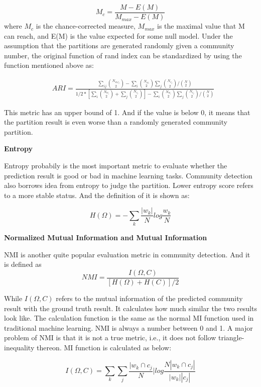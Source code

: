 $$
M_{c} = \frac{M-E(M)}{M_{max}-E(M)}
$$
where $M_{c}$ is the chance-corrected measure, $M_{max}$ is the maximal value that M can
reach, and E(M) is the value expected for some null model. Under the assumption that the partitions are generated randomly given a community number, the original function of rand index can be standardized by using the function mentioned above as:

$$
\begin{aligned} 
&ARI = \frac{\sum_{ij}\binom{N_{w_{i}c_{j}}}{2} -\sum_{i}\binom{N_{w_{i}}}{2} \sum_{j}\binom{N_{c_{j}}}{2}/\binom{N}{2}}{1/2*[\sum_{i}\binom{N_{w_{i}}}{2}+\sum_{j}\binom{N_{c_{j}}}{2}]-\sum_{i}\binom{N_{w_{i}}}{2} \sum_{j}\binom{N_{c_{j}}}{2}/\binom{N}{2}} 
\end{aligned}
$$

This metric has an upper bound of 1. And if the value is below 0, it means that the partition result is even worse than a randomly generated community partition. 


\textbf{Entropy}

Entropy probabily is the most important metric to evaluate whether the prediction result is good or bad in machine learning tasks. Community detection also borrows idea from entropy to judge the partition. Lower entropy score refers to a more stable status. And the definition of it is shown as:

$$H(\Omega) = - \sum_{k} \frac{|w_{k}|}{N}log \frac{w_{k}}{N}$$

\textbf{Normalized Mutual Information and Mutual Information}

NMI \cite{schutze2008introduction,strehl2002cluster,fortunato2009community} is another quite popular evaluation metric in community detection. And it is defined as 
$$NMI =  \frac{I(\Omega,C)}{[H(\Omega)+H(C)]/2}$$

While $I(\Omega,C)$ refers to the mutual information of the predicted community result with the ground truth result. It calculates how much similar the two results look like. The calculation function is the same as the normal MI function used in traditional machine learning. NMI is always a number between 0 and 1. A major problem of NMI is that it is not
a true metric, i.e., it does not follow triangle-inequality thereon. MI function is calculated as below:

$$I(\Omega,C) = \sum_{k}\sum_{j}\frac{|w_{k} \cap c_{j}}{N}| log \frac{N|w_{k} \cap c_{j}|}{|w_{k}||c_{j}|}$$


